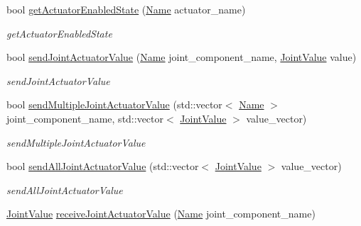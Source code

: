 \begin{DoxyCompactItemize}
bool \hyperlink{classrobotis__manipulator_1_1_robotis_manipulator_a6e35facbe46c68db4e77d28495c636c4}{get\+Actuator\+Enabled\+State} (\hyperlink{namespacerobotis__manipulator_a08c2d25e77a01ad75b9bb740f8ce4765}{Name} actuator\+\_\+name)
\begin{DoxyCompactList}\small\item\em get\+Actuator\+Enabled\+State \end{DoxyCompactList}\item 
bool \hyperlink{classrobotis__manipulator_1_1_robotis_manipulator_a1e7fb766c94010660f5d9c6ffa0d898b}{send\+Joint\+Actuator\+Value} (\hyperlink{namespacerobotis__manipulator_a08c2d25e77a01ad75b9bb740f8ce4765}{Name} joint\+\_\+component\+\_\+name, \hyperlink{namespacerobotis__manipulator_aa0556c98c5294ccf3a96c2d0fe315e40}{Joint\+Value} value)
\begin{DoxyCompactList}\small\item\em send\+Joint\+Actuator\+Value \end{DoxyCompactList}\item 
bool \hyperlink{classrobotis__manipulator_1_1_robotis_manipulator_ad90298397a0c6f9ffa5aa20cce0ab7e2}{send\+Multiple\+Joint\+Actuator\+Value} (std\+::vector$<$ \hyperlink{namespacerobotis__manipulator_a08c2d25e77a01ad75b9bb740f8ce4765}{Name} $>$ joint\+\_\+component\+\_\+name, std\+::vector$<$ \hyperlink{namespacerobotis__manipulator_aa0556c98c5294ccf3a96c2d0fe315e40}{Joint\+Value} $>$ value\+\_\+vector)
\begin{DoxyCompactList}\small\item\em send\+Multiple\+Joint\+Actuator\+Value \end{DoxyCompactList}\item 
bool \hyperlink{classrobotis__manipulator_1_1_robotis_manipulator_a0221920a4da676185d166415fc4d2914}{send\+All\+Joint\+Actuator\+Value} (std\+::vector$<$ \hyperlink{namespacerobotis__manipulator_aa0556c98c5294ccf3a96c2d0fe315e40}{Joint\+Value} $>$ value\+\_\+vector)
\begin{DoxyCompactList}\small\item\em send\+All\+Joint\+Actuator\+Value \end{DoxyCompactList}\item 
\hyperlink{namespacerobotis__manipulator_aa0556c98c5294ccf3a96c2d0fe315e40}{Joint\+Value} \hyperlink{classrobotis__manipulator_1_1_robotis_manipulator_a9ebd6f9d02c16ad41eebf0104a9f69cd}{receive\+Joint\+Actuator\+Value} (\hyperlink{namespacerobotis__manipulator_a08c2d25e77a01ad75b9bb740f8ce4765}{Name} joint\+\_\+component\+\_\+name)

\end{DoxyCompactItemize}
